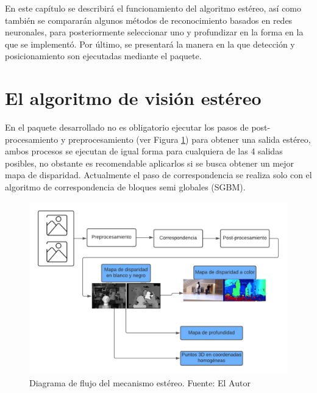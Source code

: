 En este capítulo se describirá el funcionamiento del algoritmo estéreo, así como también se compararán algunos métodos de reconocimiento basados en redes neuronales, para posteriormente seleccionar uno y profundizar en la forma en la que se implementó. Por último, se presentará la manera en la que detección y posicionamiento son ejecutadas mediante el paquete. 
\section{El algoritmo de visión estéreo}
En el paquete desarrollado no es obligatorio ejecutar los pasos de post-procesamiento y preprocesamiento (ver Figura \ref{stereo_pipeline}) para obtener una salida estéreo, ambos procesos se ejecutan de igual forma para cualquiera de las 4 salidas posibles, no obstante es recomendable aplicarlos si se busca obtener un mejor mapa de disparidad. Actualmente el paso de correspondencia se realiza solo con el algoritmo de correspondencia de bloques semi globales (SGBM).
\begin{figure}[H]
    \centering
    \includegraphics[scale=0.4]{Recursos/stereo_pipeline.png}
    \caption[Diagrama de flujo del mecanismo estéreo.]{Diagrama de flujo del mecanismo estéreo. {\footnotesize Fuente: El Autor}}
    \label{stereo_pipeline}
\end{figure}
